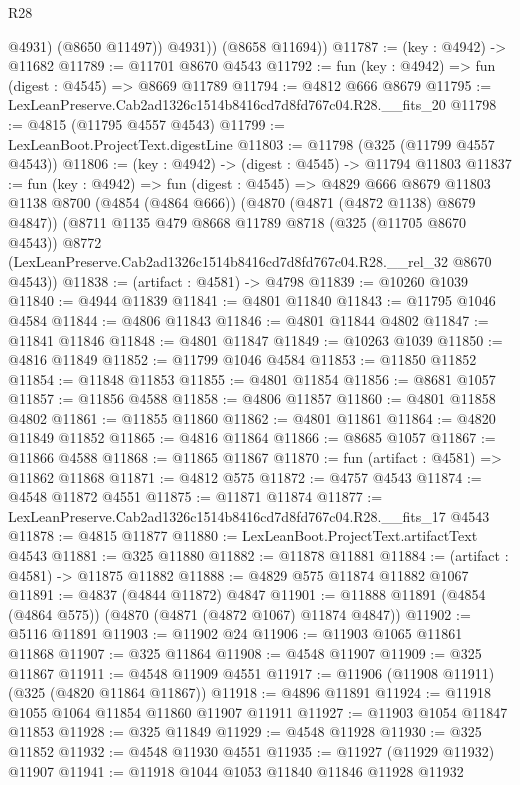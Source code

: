 \begin{lexlean}{R28}
\begin{coremodule}
              @4931)
            (@8650 @11497))
          @4931))
      (@8658 @11694))
@11787 := (key : @4942) -> @11682
@11789 := @11701 @8670 @4543
@11792 := fun (key : @4942) => fun (digest : @4545) => @8669 @11789
@11794 := @4812 @666 @8679
@11795 := LexLeanPreserve.Cab2ad1326c1514b8416cd7d8fd767c04.R28.__fits_20
@11798 := @4815 (@11795 @4557 @4543)
@11799 := LexLeanBoot.ProjectText.digestLine
@11803 := @11798 (@325 (@11799 @4557 @4543))
@11806 := (key : @4942) -> (digest : @4545) -> @11794 @11803
@11837 := fun (key : @4942) =>
  fun (digest : @4545) =>
  @4829
    @666
    @8679
    @11803
    @1138
    @8700
    (@4854 (@4864 @666))
    (@4870 (@4871 (@4872 @1138) @8679 @4847))
    (@8711
      @1135
      @479
      @8668
      @11789
      @8718
      (@325 (@11705 @8670 @4543))
      @8772
      (LexLeanPreserve.Cab2ad1326c1514b8416cd7d8fd767c04.R28.__rel_32 @8670 @4543))
@11838 := (artifact : @4581) -> @4798
@11839 := @10260 @1039
@11840 := @4944 @11839
@11841 := @4801 @11840
@11843 := @11795 @1046 @4584
@11844 := @4806 @11843
@11846 := @4801 @11844 @4802
@11847 := @11841 @11846
@11848 := @4801 @11847
@11849 := @10263 @1039
@11850 := @4816 @11849
@11852 := @11799 @1046 @4584
@11853 := @11850 @11852
@11854 := @11848 @11853
@11855 := @4801 @11854
@11856 := @8681 @1057
@11857 := @11856 @4588
@11858 := @4806 @11857
@11860 := @4801 @11858 @4802
@11861 := @11855 @11860
@11862 := @4801 @11861
@11864 := @4820 @11849 @11852
@11865 := @4816 @11864
@11866 := @8685 @1057
@11867 := @11866 @4588
@11868 := @11865 @11867
@11870 := fun (artifact : @4581) => @11862 @11868
@11871 := @4812 @575
@11872 := @4757 @4543
@11874 := @4548 @11872 @4551
@11875 := @11871 @11874
@11877 := LexLeanPreserve.Cab2ad1326c1514b8416cd7d8fd767c04.R28.__fits_17 @4543
@11878 := @4815 @11877
@11880 := LexLeanBoot.ProjectText.artifactText @4543
@11881 := @325 @11880
@11882 := @11878 @11881
@11884 := (artifact : @4581) -> @11875 @11882
@11888 := @4829 @575 @11874 @11882 @1067
@11891 := @4837 (@4844 @11872) @4847
@11901 := @11888 @11891 (@4854 (@4864 @575)) (@4870 (@4871 (@4872 @1067) @11874 @4847))
@11902 := @5116 @11891
@11903 := @11902 @24
@11906 := @11903 @1065 @11861 @11868
@11907 := @325 @11864
@11908 := @4548 @11907
@11909 := @325 @11867
@11911 := @4548 @11909 @4551
@11917 := @11906 (@11908 @11911) (@325 (@4820 @11864 @11867))
@11918 := @4896 @11891
@11924 := @11918 @1055 @1064 @11854 @11860 @11907 @11911
@11927 := @11903 @1054 @11847 @11853
@11928 := @325 @11849
@11929 := @4548 @11928
@11930 := @325 @11852
@11932 := @4548 @11930 @4551
@11935 := @11927 (@11929 @11932) @11907
@11941 := @11918 @1044 @1053 @11840 @11846 @11928 @11932

\end{coremodule}
\end{lexlean}

